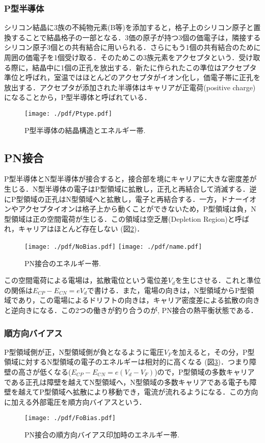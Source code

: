 \subsubsection*{P型半導体}
シリコン結晶に3族の不純物元素(B等)を添加すると，格子上のシリコン原子と置換することで結晶格子の一部となる．3価の原子が持つ3個の価電子は，隣接するシリコン原子3個との共有結合に用いられる．さらにもう1個の共有結合のために周囲の価電子を1個受け取る．そのためこの3族元素をアクセプタという．受け取る際に，結晶中に1個の正孔を放出する．新たに作られたこの準位はアクセプタ準位と呼ばれ，室温ではほとんどのアクセプタがイオン化し，価電子帯に正孔を放出する．アクセプタが添加された半導体はキャリアが正電荷(positive charge)になることから，P型半導体と呼ばれている．
\begin{figure}[h]
	\centering
	\texttt{[image: ./pdf/Ptype.pdf]}
	\caption{P型半導体の結晶構造とエネルギー帯.}
	\label{fig:Ptype}
\end{figure}
\subsection{PN接合}
\label{sub:pn}
P型半導体とN型半導体が接合すると，接合部を境にキャリアに大きな密度差が生じる．N型半導体の電子はP型領域に拡散し，正孔と再結合して消滅する．逆にP型領域の正孔はN型領域へと拡散し，電子と再結合する．一方，ドナーイオンやアクセプタイオンは格子上から動くことができないため，P型領域は負，N型領域は正の空間電荷が生じる．この領域は空乏層(Depletion Region)と呼ばれ，キャリアはほとんど存在しない (図\ref{fig:NoBias})．\par
\begin{figure}[h]
	\centering
	\texttt{[image: ./pdf/NoBias.pdf]}
	\texttt{[image: ./pdf/name.pdf]}
	\caption{PN接合のエネルギー帯.}
	\label{fig:NoBias}
\end{figure}
この空間電荷による電場は，拡散電位という電位差$V_{d}$を生じさせる．これと準位の関係は$E_{CP}-E_{CN}=eV_{d}$で書ける．また，電場の向きは，N型領域からP型領域であり，この電場によるドリフトの向きは，キャリア密度差による拡散の向きと逆向きになる．この2つの働きが釣り合うのが, PN接合の熱平衡状態である．\par

\subsubsection*{順方向バイアス}
P型領域側が正，N型領域側が負となるように電圧$V_{F}$を加えると，その分，P型領域に対するN型領域の電子のエネルギーは相対的に高くなる (図\ref{fig:FoBias})．つまり障壁の高さが低くなる($E_{CP}-E_{CN}=e(V_{d}-V_{F})$)ので，P型領域の多数キャリアである正孔は障壁を越えてN型領域へ，N型領域の多数キャリアである電子も障壁を越えてP型領域へ拡散により移動でき，電流が流れるようになる．この方向に加える外部電圧を順方向バイアスという．\par
\begin{figure}[h]
	\centering
	\texttt{[image: ./pdf/FoBias.pdf]}
	\caption{PN接合の順方向バイアス印加時のエネルギー帯.}
	\label{fig:FoBias}
\end{figure}

